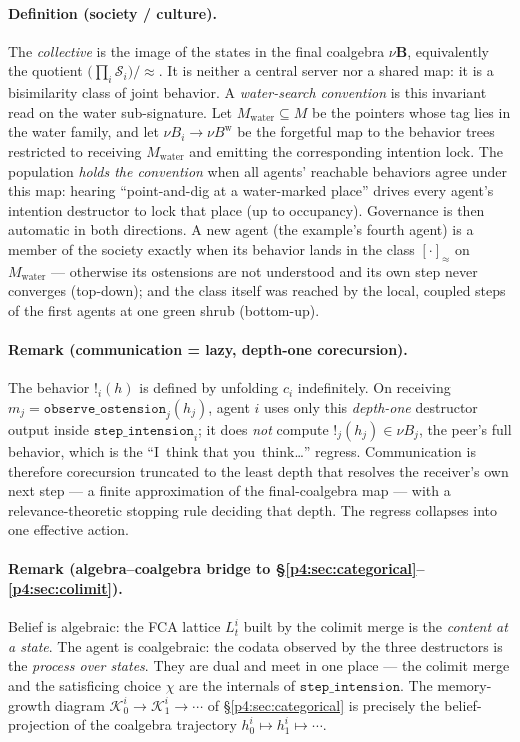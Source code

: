 \documentclass{article}
\newcommand{\method}[1]{\texttt{#1}}
\begin{document}
\paragraph{Definition (society / culture).}
The \emph{collective} is the image of the states in the final coalgebra
$\nu\mathbf{B}$, equivalently the quotient $\big(\prod_i\mathcal{S}_i\big)/\!\approx$.
It is neither a central server nor a shared map: it is a bisimilarity class of
joint behavior. A \emph{water-search convention} is this invariant read on
the water sub-signature. Let $M_{\mathrm{water}}\subseteq M$ be the pointers
whose tag lies in the water family, and let
$\nu B_i\to\nu B^{\mathrm{w}}$ be the forgetful map to the behavior trees
restricted to receiving $M_{\mathrm{water}}$ and emitting the corresponding
intention lock. The population \emph{holds the convention} when all agents'
reachable behaviors agree under this map: hearing ``point-and-dig at a
water-marked place'' drives every agent's intention destructor to lock that
place (up to occupancy). Governance is then automatic in both directions. A
new agent (the example's fourth agent) is a member of the society exactly
when its behavior lands in the class $[\cdot]_{\approx}$ on
$M_{\mathrm{water}}$ --- otherwise its ostensions are not understood and its
own step never converges (top-down); and the class itself was reached by the
local, coupled steps of the first agents at one green shrub (bottom-up).

\paragraph{Remark (communication = lazy, depth-one corecursion).}
The behavior $!_i(h)$ is defined by unfolding $c_i$ indefinitely. On
receiving $m_j=\method{observe\_ostension}_j(h_j)$, agent $i$ uses only this
\emph{depth-one} destructor output inside $\method{step\_intension}_i$; it
does \emph{not} compute $!_j(h_j)\in\nu B_j$, the peer's full behavior, which
is the ``I~think that you~think\ldots'' regress. Communication is therefore
corecursion truncated to the least depth that resolves the receiver's own
next step --- a finite approximation of the final-coalgebra map --- with a
relevance-theoretic stopping rule \citep{sperber1995relevance} deciding that depth. The
regress collapses into one effective action.

\paragraph{Remark (algebra--coalgebra bridge to \S\ref{p4:sec:categorical}--\ref{p4:sec:colimit}).}
Belief is algebraic: the FCA lattice $L_t^i$ built by the colimit merge is
the \emph{content at a state}. The agent is coalgebraic: the codata observed
by the three destructors is the \emph{process over states}. They are dual and
meet in one place --- the colimit merge and the satisficing choice $\chi$ are
the internals of $\method{step\_intension}$. The memory-growth diagram
$\mathcal{K}_0^i\to\mathcal{K}_1^i\to\cdots$ of \S\ref{p4:sec:categorical} is
precisely the belief-projection of the coalgebra trajectory
$h_0^i\mapsto h_1^i\mapsto\cdots$.
\end{document}
